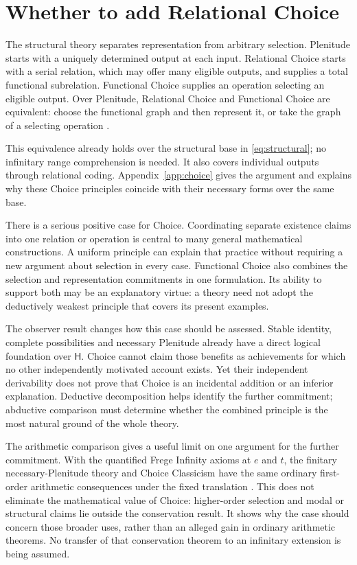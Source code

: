 \documentclass[12pt,letterpaper]{article}
\newcommand{\Hlogic}{\mathsf H}
\begin{document}
\section{Whether to add Relational Choice}\label{sec:choice}

The structural theory separates representation from arbitrary selection. Plenitude starts with a uniquely determined output at each input. Relational Choice starts with a serial relation, which may offer many eligible outputs, and supplies a total functional subrelation. Functional Choice supplies an operation selecting an eligible output. Over Plenitude, Relational Choice and Functional Choice are equivalent: choose the functional graph and then represent it, or take the graph of a selecting operation \citep[\S2.3, pp.~31--32]{bacondorr}.

This equivalence already holds over the structural base in \eqref{eq:structural}; no infinitary range comprehension is needed. It also covers individual outputs through relational coding. Appendix~\ref{app:choice} gives the argument and explains why these Choice principles coincide with their necessary forms over the same base.

There is a serious positive case for Choice. Coordinating separate existence claims into one relation or operation is central to many general mathematical constructions. A uniform principle can explain that practice without requiring a new argument about selection in every case. Functional Choice also combines the selection and representation commitments in one formulation. Its ability to support both may be an explanatory virtue: a theory need not adopt the deductively weakest principle that covers its present examples.

The observer result changes how this case should be assessed. Stable identity, complete possibilities and necessary Plenitude already have a direct logical foundation over $\Hlogic$. Choice cannot claim those benefits as achievements for which no other independently motivated account exists. Yet their independent derivability does not prove that Choice is an incidental addition or an inferior explanation. Deductive decomposition helps identify the further commitment; abductive comparison must determine whether the combined principle is the most natural ground of the whole theory.

The arithmetic comparison gives a useful limit on one argument for the further commitment. With the quantified Frege Infinity axioms at $e$ and $t$, the finitary necessary-Plenitude theory and Choice Classicism have the same ordinary first-order arithmetic consequences under the fixed translation \citep{uniformitynote}. This does not eliminate the mathematical value of Choice: higher-order selection and modal or structural claims lie outside the conservation result. It shows why the case should concern those broader uses, rather than an alleged gain in ordinary arithmetic theorems. No transfer of that conservation theorem to an infinitary extension is being assumed.
\end{document}

